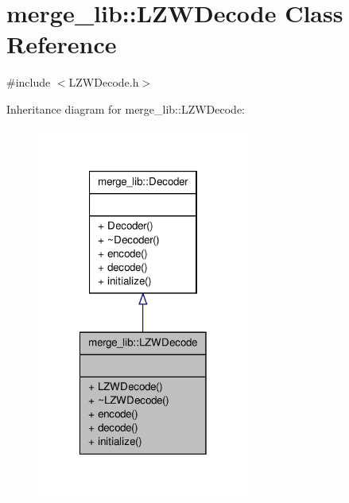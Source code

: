 \hypertarget{classmerge__lib_1_1_l_z_w_decode}{\section{merge\-\_\-lib\-:\-:L\-Z\-W\-Decode Class Reference}
\label{d9/d70/classmerge__lib_1_1_l_z_w_decode}
}


{\ttfamily \#include $<$L\-Z\-W\-Decode.\-h$>$}



Inheritance diagram for merge\-\_\-lib\-:\-:L\-Z\-W\-Decode\-:
\nopagebreak
\begin{figure}[H]
\begin{center}
\leavevmode
\includegraphics[width=198pt]{d8/dca/classmerge__lib_1_1_l_z_w_decode__inherit__graph}
\end{center}
\end{figure}


